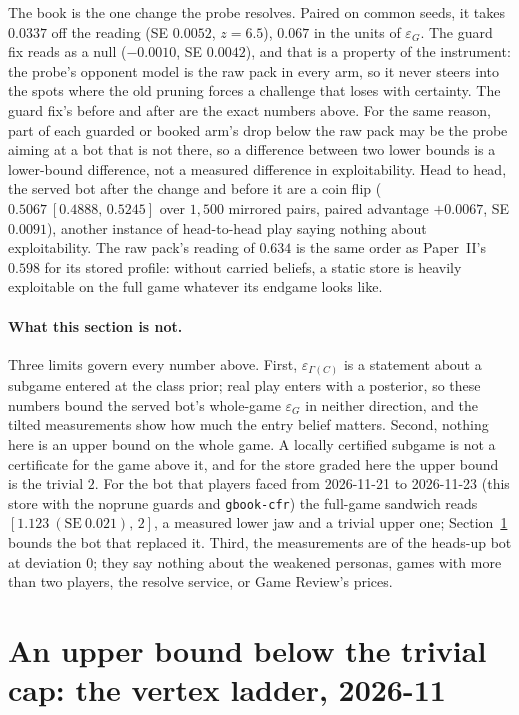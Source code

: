 \documentclass[11pt]{article}
\theoremstyle{plain}
\theoremstyle{definition}
\theoremstyle{remark}
\newcommand{\code}[1]{\texttt{\small #1}}
\newcommand{\game}{\ensuremath{G}}
\newcommand{\epsG}{\ensuremath{\varepsilon_{\game}}}
\begin{document}
The book is the one change the probe resolves. Paired on common seeds,
it takes $0.0337$ off the reading (SE $0.0052$, $z=6.5$), $0.067$ in
the units of $\epsG$. The guard fix reads as a null ($-0.0010$, SE
$0.0042$), and that is a property of the instrument: the probe's
opponent model is the raw pack in every arm, so it never steers into
the spots where the old pruning forces a challenge that loses with
certainty. The guard fix's before and after are the exact numbers
above. For the same reason, part of each guarded or booked arm's drop
below the raw pack may be the probe aiming at a bot that is not there,
so a difference between two lower bounds is a lower-bound difference,
not a measured difference in exploitability. Head to head, the served
bot after the change and before it are a coin flip ($0.5067\ [0.4888,\,0.5245]$
over $1{,}500$ mirrored pairs, paired advantage $+0.0067$, SE $0.0091$),
another instance of head-to-head play saying nothing about
exploitability. The raw pack's reading of $0.634$ is the same order as
Paper~II's $0.598$ for its stored profile: without carried beliefs, a
static store is heavily exploitable on the full game whatever its
endgame looks like.

\paragraph{What this section is not.} Three limits govern every number
above. First, $\varepsilon_{\Gamma(C)}$ is a statement about a subgame
entered at the class prior; real play enters with a posterior, so these
numbers bound the served bot's whole-game $\epsG$ in neither direction,
and the tilted measurements show how much the entry belief matters.
Second, nothing here is an upper bound on the whole game. A locally
certified subgame is not a certificate for the game above it, and for
the store graded here the upper bound is the trivial $2$. For the bot
that players faced from 2026-11-21 to 2026-11-23 (this store with the
noprune guards and \code{gbook-cfr}) the full-game sandwich reads
$[1.123\ (\mathrm{SE}\ 0.021),\,2]$, a measured lower jaw and a trivial
upper one; Section~\ref{sec:vertex} bounds the bot that replaced it.
Third, the measurements are of the heads-up bot at deviation
$0$; they say nothing about the weakened personas, games with more than
two players, the resolve service, or Game Review's
prices.

\section{An upper bound below the trivial cap: the vertex ladder,
2026-11}\label{sec:vertex}
\end{document}
